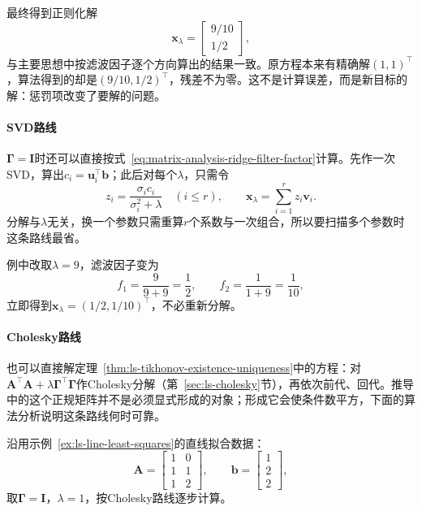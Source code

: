 最终得到正则化解
\[
 \bm x_\lambda=\begin{bmatrix}9/10\\1/2\end{bmatrix},
\]
与主要思想中按滤波因子逐个方向算出的结果一致。原方程本来有精确解$(1,1)^\top$，算法得到的却是$(9/10,1/2)^\top$，残差不为零。这不是计算误差，而是新目标的解：惩罚项改变了要解的问题。

\paragraph{SVD路线}
$\bm\Gamma=\bm I$时还可以直接按式~\eqref{eq:matrix-analysis-ridge-filter-factor}计算。先作一次SVD，算出$c_i=\bm u_i^\top\bm b$；此后对每个$\lambda$，只需令
\[
 z_i=\frac{\sigma_ic_i}{\sigma_i^2+\lambda}\quad(i\leq r),\qquad \bm x_\lambda=\sum_{i=1}^rz_i\bm v_i .
\]
分解与$\lambda$无关，换一个参数只需重算$r$个系数与一次组合，所以要扫描多个参数时这条路线最省。

例中改取$\lambda=9$，滤波因子变为
\[
 f_1=\frac9{9+9}=\frac12,\qquad f_2=\frac1{1+9}=\frac1{10},
\]
立即得到$\bm x_\lambda=(1/2,1/10)^\top$，不必重新分解。

\paragraph{Cholesky路线}
也可以直接解定理~\ref{thm:ls-tikhonov-existence-uniqueness}中的方程：对$\bm A^\top\bm A+\lambda\bm\Gamma^\top\bm\Gamma$作Cholesky分解（第~\ref{sec:ls-cholesky}节），再依次前代、回代。推导中的这个正规矩阵并不是必须显式形成的对象；形成它会使条件数平方，下面的算法分析说明这条路线何时可靠。

\begin{example}[直线拟合的岭回归]
\label{ex:ls-ridge-line-fit}
沿用示例~\ref{ex:ls-line-least-squares}的直线拟合数据：
\[
 \bm A=\begin{bmatrix}1&0\\1&1\\1&2\end{bmatrix},\qquad
 \bm b=\begin{bmatrix}1\\2\\2\end{bmatrix},
\]
取$\bm\Gamma=\bm I$，$\lambda=1$，按Cholesky路线逐步计算。
\end{example}

